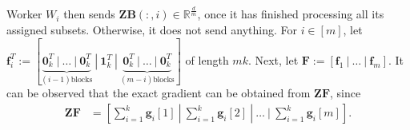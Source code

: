 \documentclass[journal,draftcls,onecolumn]{IEEEtran}
\theoremstyle{mystyle}
\newcommand{\bfF}{\mathbf{F}}
\begin{document}
Worker $W_i$ then sends $\mathbf{Z}\mathbf{B}(:,i) \in \mathbb{R}^{\frac{d}{m}}$, once it has finished processing all its assigned subsets. Otherwise, it does not send anything. For $i \in [m]$, let $\mathbf{f}_i^T := [\underbrace{\mathbf{0}_k^T ~|~ \dots ~|~ \mathbf{0}_k^T}_{(i-1) \text{blocks}} ~|~ \mathbf{1}_k^T ~|~\underbrace{\mathbf{0}_k^T~|~ \dots ~|~ \mathbf{0}_k^T}_{(m-i) \text{blocks}}]$ of length $mk$. Next, let 
$\bfF := [\mathbf{f}_1 ~|~ \dots ~|~ \mathbf{f}_m]$. It can be observed that the exact gradient can be obtained from $\mathbf{ZF}$, since
\begin{align*}
\mathbf{ZF} &= [ \sum_{i = 1}^k \mathbf{g}_i[1] ~|~ \sum_{i = 1}^k \mathbf{g}_i[2] ~|~ \dots ~|~ \sum_{i = 1}^k \mathbf{g}_i[m]].
 \end{align*}

\end{document}
